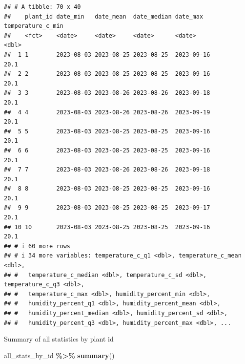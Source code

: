 \documentclass[
]{article}
\newenvironment{Shaded}{\begin{snugshade}}{\end{snugshade}}
\newcommand{\FunctionTok}[1]{\textcolor[rgb]{0.13,0.29,0.53}{\textbf{#1}}}
\newcommand{\NormalTok}[1]{#1}
\newcommand{\SpecialCharTok}[1]{\textcolor[rgb]{0.81,0.36,0.00}{\textbf{#1}}}
\begin{document}
\begin{verbatim}
## # A tibble: 70 x 40
##    plant_id date_min   date_mean  date_median date_max   temperature_c_min
##    <fct>    <date>     <date>     <date>      <date>                 <dbl>
##  1 1        2023-08-03 2023-08-25 2023-08-25  2023-09-16              20.1
##  2 2        2023-08-03 2023-08-25 2023-08-25  2023-09-16              20.1
##  3 3        2023-08-03 2023-08-26 2023-08-26  2023-09-18              20.1
##  4 4        2023-08-03 2023-08-26 2023-08-26  2023-09-19              20.1
##  5 5        2023-08-03 2023-08-25 2023-08-25  2023-09-16              20.1
##  6 6        2023-08-03 2023-08-25 2023-08-25  2023-09-16              20.1
##  7 7        2023-08-03 2023-08-26 2023-08-26  2023-09-18              20.1
##  8 8        2023-08-03 2023-08-25 2023-08-25  2023-09-16              20.1
##  9 9        2023-08-03 2023-08-25 2023-08-25  2023-09-17              20.1
## 10 10       2023-08-03 2023-08-25 2023-08-25  2023-09-16              20.1
## # i 60 more rows
## # i 34 more variables: temperature_c_q1 <dbl>, temperature_c_mean <dbl>,
## #   temperature_c_median <dbl>, temperature_c_sd <dbl>, temperature_c_q3 <dbl>,
## #   temperature_c_max <dbl>, humidity_percent_min <dbl>,
## #   humidity_percent_q1 <dbl>, humidity_percent_mean <dbl>,
## #   humidity_percent_median <dbl>, humidity_percent_sd <dbl>,
## #   humidity_percent_q3 <dbl>, humidity_percent_max <dbl>, ...
\end{verbatim}

Summary of all statistics by plant id

\begin{Shaded}
\begin{Highlighting}[]
\NormalTok{all\_stats\_by\_id }\SpecialCharTok{\%\textgreater{}\%} \FunctionTok{summary}\NormalTok{()}
\end{Highlighting}
\end{Shaded}
\end{document}
